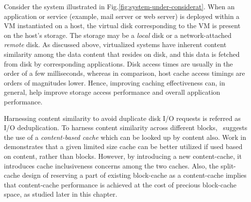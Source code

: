Consider the system illustrated in Fig.\ref{fig:system-under-considerat}.
When an application or service (example, mail server or web server) is deployed 
within a VM instantiated on a host,
the virtual disk corresponding to the VM is present on the host's storage.
The storage may be a \textit{local} disk or a network-attached
\textit{remote} disk.
As discussed above, virtualized systems have inherent content similarity
among the data content that resides on disk, and this data is fetched 
from disk by corresponding applications. 
Disk access times are usually in the order of a few 
milliseconds\cite{google, data-domain}, whereas in comparison, 
host cache access timings are orders of magnitudes lower\cite{pagecache}. 
Hence, improving caching
effectiveness can, in general, help improve storage access performance
and overall application performance.


Harnessing content similarity 
to avoid duplicate disk I/O requests %
is referred as I/O deduplication.
To harness content similarity across different blocks,~\cite{iodedup} 
suggests the use of a 
\textit{content-based cache} which can be looked up by content also.
Work in \cite{iodedup} demonstrates that a 
given limited size cache can be better utilized if used based on
content, rather than blocks.
However, by introducing a new content-cache, it introduces
cache inclusiveness concerns among the two caches. Also, the
split-cache design of reserving a part of existing block-cache as
a content-cache implies that content-cache performance is
achieved at the cost of precious block-cache space, as studied later
in this chapter.
